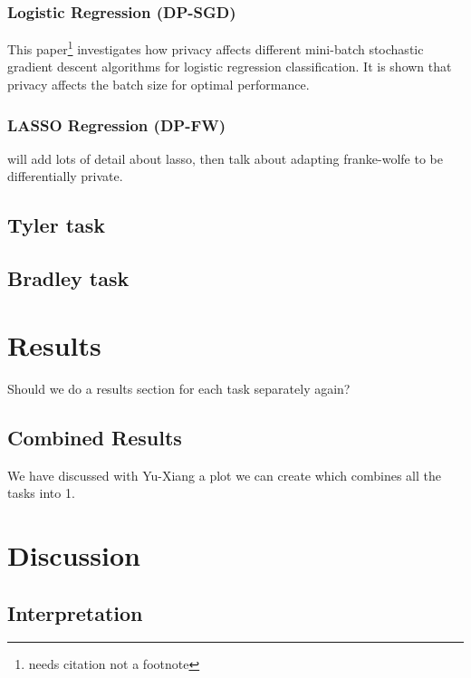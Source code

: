 \documentclass[12pt,letterpaper]{article}
\begin{document}
\subsubsection{Logistic Regression (DP-SGD)}

This paper\footnote{needs citation not a footnote} investigates how privacy affects different mini-batch stochastic gradient descent algorithms for logistic regression classification. It is shown that privacy affects the batch size for optimal performance.

\subsubsection{LASSO Regression (DP-FW)}

will add lots of detail about lasso, then talk about adapting franke-wolfe to be differentially private. 

\subsection{Tyler task}

\subsection{Bradley task}



\section{Results}

Should we do a results section for each task separately again?


\subsection{Combined Results}

We have discussed with Yu-Xiang a plot we can create which combines all the tasks into 1. 



\section{Discussion}


\subsection{Interpretation}
\end{document}

